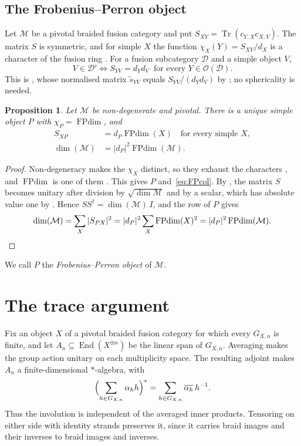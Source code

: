 \documentclass[11pt,oneside]{amsart}
\newtheorem{proposition}[theorem]{Proposition}
\theoremstyle{remark}
\newcommand{\M}{\mathcal M}
\newcommand{\D}{\mathcal D}
\newcommand{\FP}{\operatorname{FPdim}}
\newcommand{\Tr}{\operatorname{Tr}}
\newcommand{\End}{\operatorname{End}}
\newcommand{\cO}{\mathcal O}
\begin{document}
\subsection{The Frobenius--Perron object}\label{ssec:FP}
Let $\M$ be a pivotal braided fusion category and put
$S_{XY}=\Tr(c_{Y,X}c_{X,Y})$. The matrix $S$ is symmetric, and for simple $X$
the function $\chi_X(Y)=S_{XY}/d_X$ is a character of the fusion ring
\cite[\S2.2, Proposition~2.4]{La}. For a fusion subcategory $\D$ and a simple object
$V$,
\begin{equation}\label{eq:centraliser}
V\in\D'\iff S_{YV}=d_Yd_V\ \text{ for every }Y\in\cO(\D).
\end{equation}
This is \cite[Proposition~C.3]{DGNO}, whose normalised matrix $\tilde s_{YV}$ equals
$S_{YV}/(d_Yd_V)$ by \cite[\S2.2]{La}; no sphericality is needed.

\begin{proposition}\label{prop:FPobject}
Let $\M$ be non-degenerate and pivotal. There is a unique simple object $P$
with $\chi_P=\FP$, and
\begin{align}
S_{XP}&=d_P\FP(X)\quad\text{for every simple }X,\label{eq:FPcol}\\
\dim(\M)&=|d_P|^2\FP(\M).\label{eq:FPdim}
\end{align}
\end{proposition}

\begin{proof}
Non-degeneracy makes the $\chi_X$ distinct, so they exhaust the characters
\cite[\S2.4]{La}, and $\FP$ is one of them \cite[Proposition~3.3.6]{EGNO}. This gives
$P$ and~\eqref{eq:FPcol}. By \cite[Corollary~2.20]{La}, the matrix $S$ becomes
unitary after division by $\sqrt{\dim\M}$ and by a scalar, which has absolute
value one by \cite[Proposition~2.13]{La}. Hence $SS^\dagger=\dim(\M)\,I$, and
the row of $P$ gives
\[
\dim(\M)=\sum_X|S_{PX}|^2=|d_P|^2\sum_X\FP(X)^2=|d_P|^2\FP(\M).\qedhere
\]
\end{proof}

We call $P$ the \emph{Frobenius--Perron object} of $\M$.

\section{The trace argument}\label{sec:trace}

Fix an object $X$ of a pivotal braided fusion category for which every
$G_{X,n}$ is finite, and let $A_n\subseteq\End(X^{\otimes n})$ be the linear
span of $G_{X,n}$. Averaging makes the group action unitary on each
multiplicity space. The resulting adjoint makes $A_n$ a finite-dimensional
$*$-algebra, with
\[
\Bigl(\sum_{h\in G_{X,n}}\alpha_hh\Bigr)^*=\sum_{h\in G_{X,n}}\overline{\alpha_h}\,h^{-1}.
\]
Thus the involution is independent of the averaged inner products. Tensoring on
either side with identity strands preserves it, since it carries braid images
and their inverses to braid images and inverses.
\end{document}
